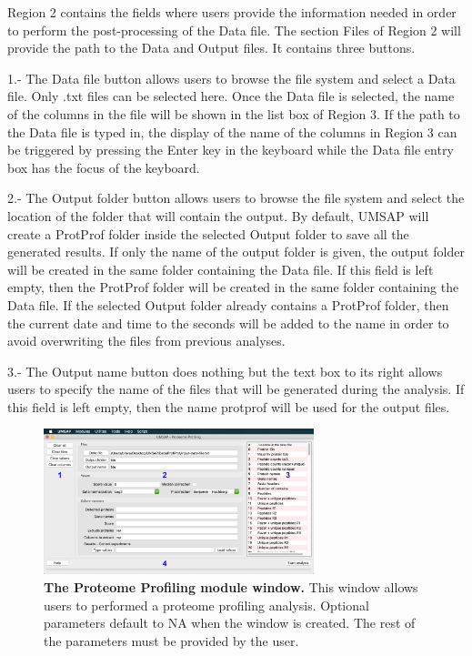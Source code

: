 Region \num{2} contains the fields where users provide the information needed in order to perform the post-processing of the Data file. The section Files of Region \num{2} will provide the path to the Data and Output files. It contains three buttons. 

\num{1}.- The Data file button allows users to browse the file system and select a Data file. Only .txt files can be selected here. Once the Data file is selected, the name of the columns in the file will be shown in the list box of Region \num{3}. If the path to the Data file is typed in, the display of the name of the columns in Region \num{3} can be triggered by pressing the Enter key in the keyboard while the Data file entry box has the focus of the keyboard.

\num{2}.- The Output folder\label{par:protprofOutFolder} button allows users to browse the file system and select the location of the folder that will contain the output. By default, UMSAP will create a ProtProf folder inside the selected Output folder to save all the generated results. If only the name of the output folder is given, the output folder will be created in the same folder containing the Data file. If this field is left empty, then the ProtProf folder will be created in the same folder containing the Data file. If the selected Output folder already contains a ProtProf folder, then the current date and time to the seconds will be added to the name in order to avoid overwriting the files from previous analyses.

\num{3}.- The Output name button does nothing but the text box to its right allows users to specify the name of the files that will be generated during the analysis. If this field is left empty, then the name protprof will be used for the output files. 

\begin{figure}[h]
	\centering
	\includegraphics[width=0.7\textwidth]{./IMAGES/MOD-PROTPROF/protprof-mod.jpg}
	\caption[The Proteome Profiling module window]{\textbf{The Proteome Profiling module window.} This window allows users to performed a proteome profiling analysis. Optional parameters default to NA when the window is created. The rest of the parameters must be provided by the user.} 
	\label{fig:protprofMainWindow}
	\vspace{-5pt} 	
\end{figure} 

